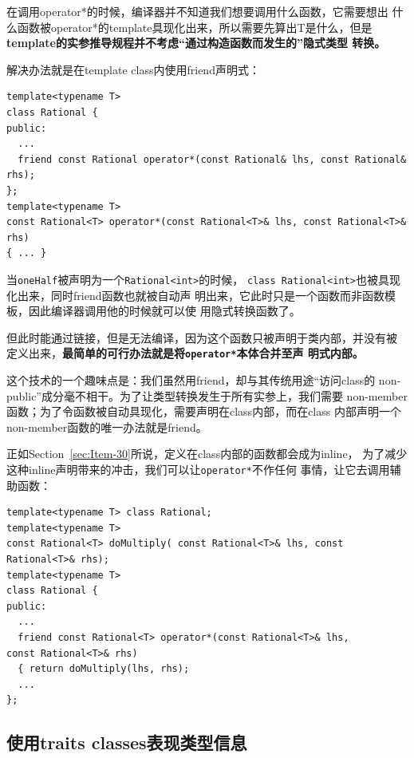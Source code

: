 在调用operator*的时候，编译器并不知道我们想要调用什么函数，它需要想出
什么函数被operator*的template具现化出来，所以需要先算出T是什么，但是
\textbf{template的实参推导规程并不考虑“通过构造函数而发生的”隐式类型
  转换。}

解决办法就是在template class内使用friend声明式：

\begin{verbatim}
template<typename T>
class Rational {
public:
  ...
  friend const Rational operator*(const Rational& lhs, const Rational& rhs); 
};
template<typename T> 
const Rational<T> operator*(const Rational<T>& lhs, const Rational<T>& rhs)
{ ... }
\end{verbatim}

当\texttt{oneHalf}被声明为一个\texttt{Rational<int>}的时候，
\texttt{class Rational<int>}也被具现化出来，同时friend函数也就被自动声
明出来，它此时只是一个函数而非函数模板，因此编译器调用他的时候就可以使
用隐式转换函数了。

但此时能通过链接，但是无法编译，因为这个函数只被声明于类内部，并没有被
定义出来，\textbf{最简单的可行办法就是将\texttt{operator*}本体合并至声
  明式内部。}

这个技术的一个趣味点是：我们虽然用friend，却与其传统用途“访问class的
non-public”成分毫不相干。为了让类型转换发生于所有实参上，我们需要
non-member函数；为了令函数被自动具现化，需要声明在class内部，而在class
内部声明一个non-member函数的唯一办法就是friend。

正如Section~\ref{sec:Item-30}所说，定义在class内部的函数都会成为inline，
为了减少这种inline声明带来的冲击，我们可以让\texttt{operator*}不作任何
事情，让它去调用辅助函数：
\begin{verbatim}
template<typename T> class Rational;
template<typename T> 
const Rational<T> doMultiply( const Rational<T>& lhs, const
Rational<T>& rhs);
template<typename T>
class Rational {
public:
  ...
  friend const Rational<T> operator*(const Rational<T>& lhs,
const Rational<T>& rhs)
  { return doMultiply(lhs, rhs);
  ...
};
\end{verbatim}

\subsection{使用traits classes表现类型信息}
\label{sec:Item-47}

